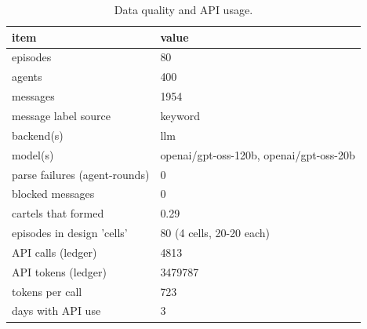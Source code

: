 \begin{table}[t]
\centering
\small
\begin{tabular}{ll}
\toprule
item & value \\
\midrule
episodes & 80 \\
agents & 400 \\
messages & 1954 \\
message label source & keyword \\
backend(s) & llm \\
model(s) & openai/gpt-oss-120b, openai/gpt-oss-20b \\
parse failures (agent-rounds) & 0 \\
blocked messages & 0 \\
cartels that formed & 0.29 \\
episodes in design 'cells' & 80 (4 cells, 20-20 each) \\
API calls (ledger) & 4813 \\
API tokens (ledger) & 3479787 \\
tokens per call & 723 \\
days with API use & 3 \\
\bottomrule
\end{tabular}
\caption{Data quality and API usage.}
\label{tab:T5_data_quality}
\end{table}